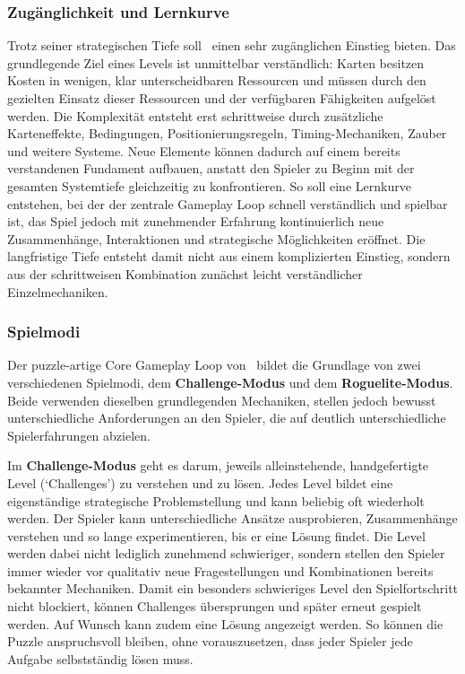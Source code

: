 \subsubsection{Zugänglichkeit und Lernkurve}
Trotz seiner strategischen Tiefe soll \coc\ einen sehr zugänglichen Einstieg bieten.
Das grundlegende Ziel eines Levels ist unmittelbar verständlich: Karten besitzen Kosten in wenigen, klar unterscheidbaren Ressourcen und müssen durch den gezielten Einsatz dieser Ressourcen und der verfügbaren Fähigkeiten aufgelöst werden.
Die Komplexität entsteht erst schrittweise durch zusätzliche Karteneffekte, Bedingungen, Positionierungsregeln, Timing-Mechaniken, Zauber und weitere Systeme.
Neue Elemente können dadurch auf einem bereits verstandenen Fundament aufbauen, anstatt den Spieler zu Beginn mit der gesamten Systemtiefe gleichzeitig zu konfrontieren.
So soll eine Lernkurve entstehen, bei der der zentrale Gameplay Loop schnell verständlich und spielbar ist, das Spiel jedoch mit zunehmender Erfahrung kontinuierlich neue Zusammenhänge, Interaktionen und strategische Möglichkeiten eröffnet.
Die langfristige Tiefe entsteht damit nicht aus einem komplizierten Einstieg, sondern aus der schrittweisen Kombination zunächst leicht verständlicher Einzelmechaniken.

\subsubsection{Spielmodi}
Der puzzle-artige Core Gameplay Loop von \coc\ bildet die Grundlage von zwei verschiedenen Spielmodi, dem \textbf{Challenge-Modus} und dem \textbf{Roguelite-Modus}.
Beide verwenden dieselben grundlegenden Mechaniken, stellen jedoch bewusst unterschiedliche Anforderungen an den Spieler, die auf deutlich unterschiedliche Spielerfahrungen abzielen.

Im \textbf{Challenge-Modus} geht es darum, jeweils alleinstehende, handgefertigte Level (`Challenges') zu verstehen und zu lösen.
Jedes Level bildet eine eigenständige strategische Problemstellung und kann beliebig oft wiederholt werden.
Der Spieler kann unterschiedliche Ansätze ausprobieren, Zusammenhänge verstehen und so lange experimentieren, bis er eine Lösung findet.
Die Level werden dabei nicht lediglich zunehmend schwieriger, sondern stellen den Spieler immer wieder vor qualitativ neue Fragestellungen und Kombinationen bereits bekannter Mechaniken.
Damit ein besonders schwieriges Level den Spielfortschritt nicht blockiert, können Challenges übersprungen und später erneut gespielt werden.
Auf Wunsch kann zudem eine Lösung angezeigt werden.
So können die Puzzle anspruchsvoll bleiben, ohne vorauszusetzen, dass jeder Spieler jede Aufgabe selbstständig lösen muss.

